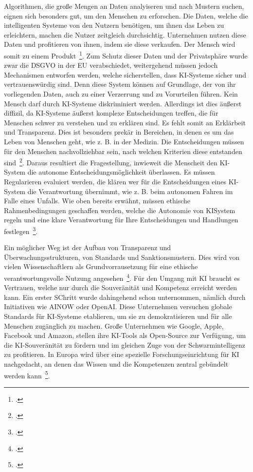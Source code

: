 Algorithmen, die große Mengen an Daten analyiseren und nach Mustern suchen, eignen sich besonders gut, um den Menschen zu erforschen. Die Daten, welche die intelligenten Systeme von den 
Nutzern benötigen, um ihnen das Leben zu erleichtern, machen die Nutzer zeitgleich durchsichtig. Unternehmen nutzen diese Daten und profitieren von ihnen, indem sie diese verkaufen. Der Mensch wird somit zu einem Produkt~\footcite[\vglf][]{Lenzen.2020}.
Zum Schutz dieser Daten und der Privatsphäre wurde zwar die \ac{DSGVO} in der \ac{EU} verabschiedet, weitergehend müssen jedoch Mechanismen entworfen werden, welche sicherstellen, dass
\ac{KI}-Systeme sicher und vertrauenswürdig sind. 
Denn diese System können auf Grundlage, der von ihr vorliegenden Daten, auch zu einer Verzerrung und zu Vorurteilen führen. Kein Mensch darf durch \ac{KI}-Systeme diskriminiert werden.
Allerdings ist dies äußerst diffizil, da \ac{KI}-Systeme äußerst komplexe Entscheidungen treffen, die für Menschen schwer zu verstehen und zu erklären sind. Es fehlt somit an 
Erklärbeit und Transparenz. Dies ist besonders prekär in Bereichen, in denen es um das Leben von Menschen geht, wie z. B. in der Medizin. Die Entscheidungen müssen für den Menschen 
nachvollziehbar sein, nach welchen Kriterien diese entstanden sind~\footcite[\vglf][]{Wittpahl.2018}.
Daraus resultiert die Fragestellung, inwieweit die Menscheit den \ac{KI}-System die autonome Entscheidungsmöglichkeit überlassen. Es müssen Regularieren evaluiert werden,
die klären wer für die Entscheidungen eines \ac{KI}-System die Verantwortung übernimmt, wie z. B. beim autonomen Fahren im Falle eines Unfalls. Wie oben bereits erwähnt, müssen ethische Rahmenbedingungen geschaffen werden, 
welche die Autonomie von \ac{KI}System regeln und eine klare Verantwortung für Ihre Entscheidungen und Handlungen festlegen~\footcite[\vglf][]{Robot.2023}.

Ein möglicher Weg ist der Aufbau von Transparenz und Überwachungsstrukturen, von Standards und Sanktionsmustern. Dies wird von vielen Wissenschaftlern als Grundvorrausetzung
für eine ethische verantwortungsvolle Nutzung angesehen~\footcite[\vglf][]{Wittpahl.2018}. Für den Umgang mit \ac{KI} braucht es Vertrauen, welche nur durch die
Souveränität und Kompetenz erreicht werden kann. Ein erster SChritt wurde dahingehend schon unternommen, nämlich durch Initiativen wie AINOW oder OpenAI. Diese Unternehmen versuchen globale Standards für \ac{KI}-Systeme
etablieren, um sie zu demokratisieren und für alle Menschen zugänglich zu machen. Große Unternehmen wie Google, Apple, Facebook und Amazon, stellen ihre KI-Tools als 
Open-Source zur Verfügung, um die KI-Souveränität zu fördern und im gleichen Zuge von der Schwarmintelligenz zu profitieren. In Europa wird über eine spezielle
Forschungseinrichtung für KI nachgedacht, an denen das Wissen und die Kompetenzen zentral gebündelt werden kann~\footcite[\vglf][]{Wittpahl.2018}.


